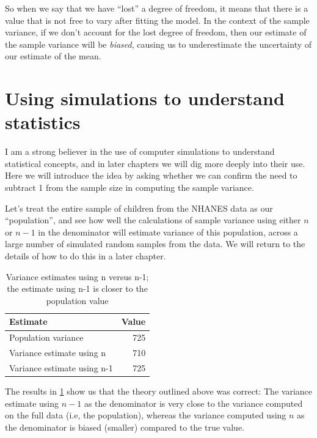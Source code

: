 \documentclass[
  12pt,
]{book}
\begin{document}
So when we say that we have ``lost'' a degree of freedom, it means that there is a value that is not free to vary after fitting the model. In the context of the sample variance, if we don't account for the lost degree of freedom, then our estimate of the sample variance will be \emph{biased}, causing us to underestimate the uncertainty of our estimate of the mean.

\hypertarget{using-simulations-to-understand-statistics}{%
\section{Using simulations to understand statistics}\label{using-simulations-to-understand-statistics}}

I am a strong believer in the use of computer simulations to understand statistical concepts, and in later chapters we will dig more deeply into their use. Here we will introduce the idea by asking whether we can confirm the need to subtract 1 from the sample size in computing the sample variance.

Let's treat the entire sample of children from the NHANES data as our ``population'', and see how well the calculations of sample variance using either \(n\) or \(n-1\) in the denominator will estimate variance of this population, across a large number of simulated random samples from the data. We will return to the details of how to do this in a later chapter.

\begin{table}

\caption{\label{tab:varsim}Variance estimates using n versus n-1; the estimate using n-1 is closer to the population value}
\centering
\begin{tabular}[t]{l|r}
\hline
Estimate & Value\\
\hline
Population variance & 725\\
\hline
Variance estimate using n & 710\\
\hline
Variance estimate using n-1 & 725\\
\hline
\end{tabular}
\end{table}

The results in \ref{tab:varsim} show us that the theory outlined above was correct: The variance estimate using \(n - 1\) as the denominator is very close to the variance computed on the full data (i.e, the population), whereas the variance computed using \(n\) as the denominator is biased (smaller) compared to the true value.
\end{document}
